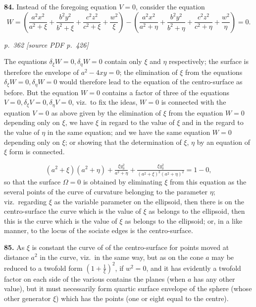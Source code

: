 \documentclass[11pt,a4paper]{article}
\newcommand{\pagemarker}[2]{\par\bigskip\noindent\textit{p.~#1 [source PDF p.~#2]}\par\smallskip}
\begin{document}
\textbf{84.} Instead of the foregoing equation $V = 0$, consider the equation
\[
W = \left(\frac{a^2 x^2}{a^2 + \xi} + \frac{b^2 y^2}{b^2 + \xi} + \frac{c^2 z^2}{c^2 + \xi} + \frac{w^2}{\xi}\right) - \left(\frac{a^2 x^2}{a^2 + \eta} + \frac{b^2 y^2}{b^2 + \eta} + \frac{c^2 z^2}{c^2 + \eta} + \frac{w^2}{\eta}\right) = 0.
\]

\clearpage

\bigskip
\pagemarker{362}{426}
\smallskip

The equations $\delta_\xi W = 0, \delta_\eta W = 0$ contain only $\xi$ and $\eta$ respectively; the surface is therefore the envelope of $a^2 - 4xy = 0$; the elimination of $\xi$ from the equations $\delta_\xi W = 0, \delta_\eta W = 0$ would therefore lead to the equation of the centro-surface as before. But the equation $W = 0$ contains a factor of three of the equations $V = 0, \delta_\xi V = 0, \delta_\eta V = 0$, viz.\ to fix the ideas, $W = 0$ is connected with the equation $V = 0$ as above given by the elimination of $\xi$ from the equation $W = 0$ depending only on $\xi$, we have $\xi$ in regard to the value of $\xi$ and in the regard to the value of $\eta$ in the same equation; and we have the same equation $W = 0$ depending only on $\xi$; or showing that the determination of $\xi$, $\eta$ by an equation of $\xi$ form is connected.

\[
(a^2 + \xi)(a^2 + \eta) + \tfrac{\xi y_0^2}{a^2 + \eta} + \tfrac{\xi y_0^2}{(a^2 + \xi)^2(a^2 + \eta)^2} = 1 - 0,
\]
so that the surface $\Omega = 0$ is obtained by eliminating $\xi$ from this equation as the several points of the curve of curvature belonging to the parameter $\eta$; viz.\ regarding $\xi$ as the variable parameter on the ellipsoid, then there is on the centro-surface the curve which is the value of $\xi$ as belongs to the ellipsoid, then this is the curve which is the value of $\xi$ as belongs to the ellipsoid; or, in a like manner, to the locus of the sociate edges is the centro-surface.

\textbf{85.} As $\xi$ is constant the curve of of the centro-surface for points moved at distance $a^2$ in the curve, viz.\ in the same way, but as on the cone $a$ may be reduced to a twofold form $\left(1 + \tfrac{1}{\xi}\right)^2$, if $w^2 = 0$, and it has evidently a twofold factor on each side of the various contains the planes (when $a$ has any other value), but it must necessarily form quartic surface envelope of the sphere (whose other generator $\xi$) which has the points (one or eight equal to the centre).
\end{document}

